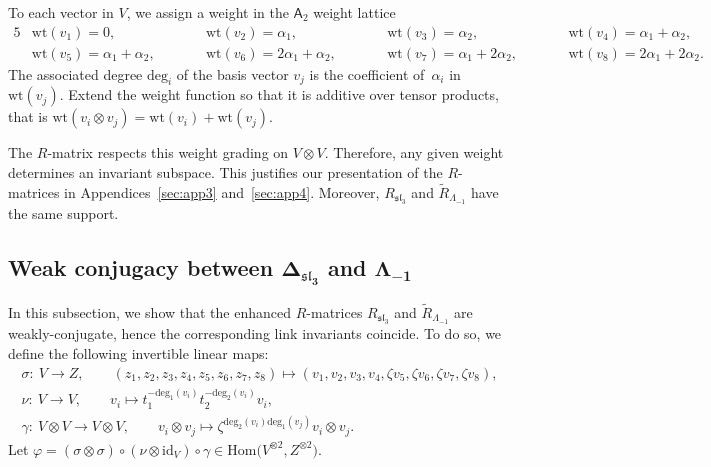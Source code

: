 \documentclass[pdftex]{sigma}
\numberwithin{equation}{section}
\theoremstyle{definition}
\begin{document}
To each vector in $V$, we assign a weight in the $\mathsf{A}_2$ weight lattice
\begin{alignat*}{5}
&\mathrm{wt}(v_1)=0, \qquad\! && \mathrm{wt}(v_2)=\alpha_1, \qquad\! &&
\mathrm{wt}(v_3)=\alpha_2, \qquad\! && \mathrm{wt}(v_4)=\alpha_1+\alpha_2,&
\\
&\mathrm{wt}(v_5)=\alpha_1+\alpha_2, \qquad\! &&
\mathrm{wt}(v_6)=2\alpha_1+\alpha_2, \qquad\! &&
\mathrm{wt}(v_7)=\alpha_1+2\alpha_2, \qquad\! && \mathrm{wt}(v_8)=2\alpha_1+2\alpha_2.&
\end{alignat*}
The associated degree $\mathrm{deg}_{i}$ of the basis vector $v_j$ is the coefficient
of~$\alpha_i$ in $\mathrm{wt}(v_j)$. Extend the weight function so that it is additive over
tensor products, that is $\mathrm{wt}(v_i\otimes v_j)=\mathrm{wt}(v_i)+\mathrm{wt}(v_j)$.

The $R$-matrix respects this weight grading on $V\otimes V$. Therefore, any given
weight determines an invariant subspace. This justifies our presentation of the
$R$-matrices in Appendices~\ref{sec:app3} and~\ref{sec:app4}. Moreover,
$R_{\mathfrak{sl}_3}$ and $\tilde{R}_{\Lambda_{-1}}$ have the same support.

\subsection[Weak conjugacy between Delta\_\{sl\_3\} and Lambda\_\{-1\}]{Weak conjugacy between $\boldsymbol{\Delta_{\mathfrak{sl}_3}}$ and $\boldsymbol{\Lambda_{-1}}$}

In this subsection, we show that the enhanced $R$-matrices $R_{\mathfrak{sl}_3}$
and $\tilde{R}_{\Lambda_{-1}}$ are weakly-conjugate, hence the corresponding
link invariants coincide. To do so, we define the following invertible linear maps:
\begin{gather*}
\sigma \colon \ V \to Z, \qquad (z_1 ,z_2 ,z_3 ,z_4 ,z_5 ,z_6 ,z_7 ,z_8)
\mapsto (v_1 ,v_2 ,v_3 ,v_4 ,\zeta v_5 ,\zeta v_6 ,\zeta v_7 , \zeta v_8),
\\
\nu \colon \ V\to V, \qquad v_i \mapsto t_1^{-\mathrm{deg}_{1}(v_i)}t_2^{-\mathrm{deg}_{2}(v_i)}v_i,
\\
\gamma \colon \ V \otimes V \to V \otimes V,\qquad
v_i\otimes v_j \mapsto \zeta^{\mathrm{deg}_{2}(v_i)\mathrm{deg}_{1}(v_j)}v_i\otimes v_j .
\end{gather*}
Let $\varphi=(\sigma\otimes\sigma)\circ (\nu\otimes \mathrm{id}_V)\circ \gamma \in \mathrm{Hom}\bigl(V^{\otimes 2},Z^{\otimes 2}\bigr)$.
\end{document}
